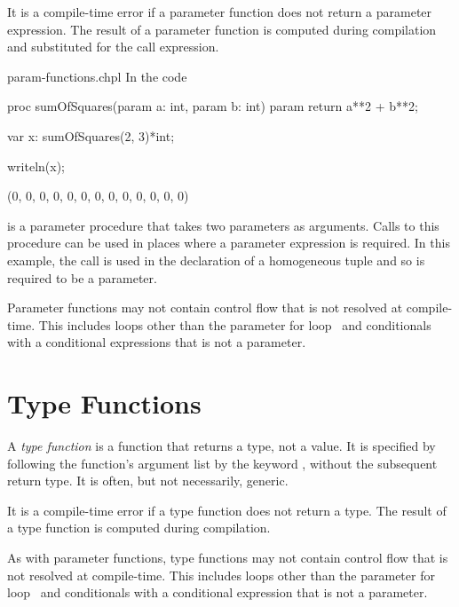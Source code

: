 It is a compile-time error if a parameter function does not return a
parameter expression.  The result of a parameter function is computed
during compilation and substituted for the call expression.

\begin{chapelexample}{param-functions.chpl}
In the code
\begin{chapel}
proc sumOfSquares(param a: int, param b: int) param
  return a**2 + b**2;

var x: sumOfSquares(2, 3)*int;
\end{chapel}
\begin{chapelpost}
writeln(x);
\end{chapelpost}
\begin{chapeloutput}
(0, 0, 0, 0, 0, 0, 0, 0, 0, 0, 0, 0, 0)
\end{chapeloutput}
 is a parameter procedure that takes
two parameters as arguments.  Calls to this procedure can be used in
places where a parameter expression is required.  In this example, the
call is used in the declaration of a homogeneous tuple and so is
required to be a parameter.
\end{chapelexample}

Parameter functions may not contain control flow that is not resolved
at compile-time.  This includes loops other than the parameter for
loop~ and conditionals with a conditional
expressions that is not a parameter.


\section{Type Functions}
\label{Type_Functions}

A \emph{type function} is a function that returns a type, not a value.  It is specified by
following the function's argument list by the keyword , without the subsequent return type.  It
is often, but not necessarily, generic.

It is a compile-time error if a type function does not return a type.
The result of a type function is computed during compilation.

As with parameter functions, type functions may not contain control
flow that is not resolved at compile-time.  This includes loops other
than the parameter for loop~ and
conditionals with a conditional expression that is not a parameter.

